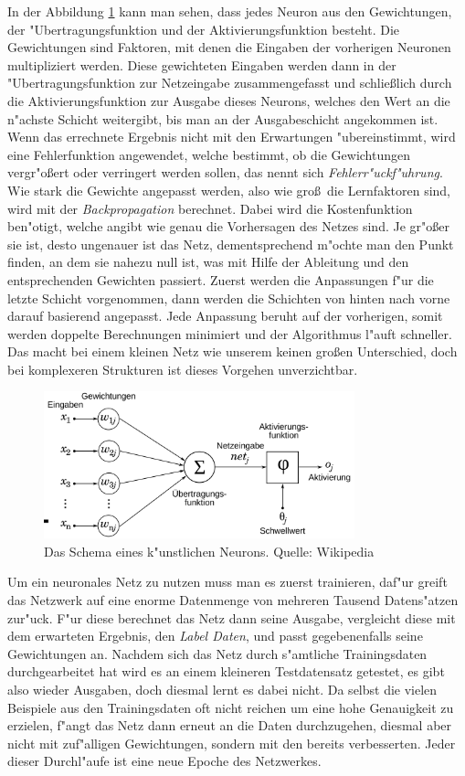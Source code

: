 \documentclass[12pt,a4paper]{scrartcl}
\begin{document}
In der Abbildung \ref{schema_net} kann man sehen, dass jedes Neuron aus den Gewichtungen, der "Ubertragungsfunktion und der Aktivierungsfunktion besteht. Die Gewichtungen sind Faktoren, mit denen die Eingaben der vorherigen Neuronen multipliziert werden. Diese gewichteten Eingaben werden dann in der "Ubertragungsfunktion zur Netzeingabe zusammengefasst und schlie\ss lich durch die Aktivierungsfunktion zur Ausgabe dieses Neurons, welches den Wert an die n"achste Schicht weitergibt, bis man an der Ausgabeschicht angekommen ist. Wenn das errechnete Ergebnis nicht mit den Erwartungen "ubereinstimmt, wird eine Fehlerfunktion angewendet, welche bestimmt, ob die Gewichtungen vergr"o\ss ert oder verringert werden sollen, das nennt sich \textit{Fehlerr"uckf"uhrung}. Wie stark die Gewichte angepasst werden, also wie gro\ss\ die Lernfaktoren sind, wird mit der \textit{Backpropagation} \label{backprop_text} berechnet. Dabei wird die Kostenfunktion ben"otigt, welche angibt wie genau die Vorhersagen des Netzes sind. Je gr"o\ss er sie ist, desto ungenauer ist das Netz, dementsprechend m"ochte man den Punkt finden, an dem sie nahezu null ist, was mit Hilfe der Ableitung und den entsprechenden Gewichten passiert. Zuerst werden die Anpassungen f"ur die letzte Schicht vorgenommen, dann werden die Schichten von hinten nach vorne darauf basierend angepasst. Jede Anpassung beruht auf der vorherigen, somit werden doppelte Berechnungen minimiert und der Algorithmus l"auft schneller. Das macht bei einem kleinen Netz wie unserem keinen gro\ss en Unterschied, doch bei komplexeren Strukturen ist dieses Vorgehen unverzichtbar. \\

\begin{figure}[h]
	\centering
	\includegraphics[width=9cm]{screens/schema_net.png}
	\caption{Das Schema eines k"unstlichen Neurons. Quelle: Wikipedia} \label{schema_net}
\end{figure}


Um ein neuronales Netz zu nutzen muss man es zuerst trainieren, daf"ur greift das Netzwerk auf eine enorme Datenmenge von mehreren Tausend Datens"atzen zur"uck. F"ur diese berechnet das Netz dann seine Ausgabe, vergleicht diese mit dem erwarteten Ergebnis, den \textit{Label Daten}, und passt gegebenenfalls seine Gewichtungen an. Nachdem sich das Netz durch s"amtliche Trainingsdaten durchgearbeitet hat wird es an einem kleineren Testdatensatz getestet, es gibt also wieder Ausgaben, doch diesmal lernt es dabei nicht. Da selbst die vielen Beispiele aus den Trainingsdaten oft nicht reichen um eine hohe Genauigkeit zu erzielen, f"angt das Netz dann erneut an die Daten durchzugehen, diesmal aber nicht mit zuf"alligen Gewichtungen, sondern mit den bereits verbesserten. Jeder dieser Durchl"aufe ist eine neue Epoche des Netzwerkes.
\end{document}
